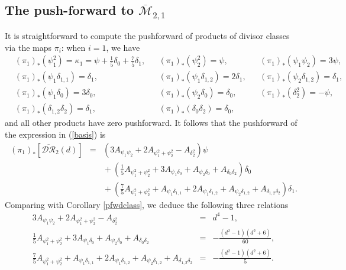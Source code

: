 \documentclass[10pt]{amsart}
\theoremstyle{definition}
\begin{document}
\subsection{The push-forward to ${\overline{\mathcal{M}}}_{2,1}$}
\label{push}
  It is straightforward to compute the pushforward of products of divisor classes via the maps $\pi_i$: when $i=1$, we have
\begin{align*}
 &(\pi_1)_*\left(\psi_1^2 \right) = \kappa_1 = \psi+\frac{1}{5}\delta_0 +\frac{7}{5}\delta_1, &&(\pi_1)_*\left(\psi_2^2 \right) = \psi, && (\pi_1)_*\left(\psi_1\psi_2 \right) = 3\psi,\\
&(\pi_1)_*\left(\psi_1\delta_{1,1} \right) = \delta_1, &&(\pi_1)_*\left(\psi_1\delta_{1,2} \right) = 2\delta_1, && (\pi_1)_*\left(\psi_2\delta_{1,2} \right) = \delta_1,\\
&(\pi_1)_*\left(\psi_1\delta_0 \right) = 3\delta_0, &&(\pi_1)_*\left(\psi_2\delta_0 \right) = \delta_0, && (\pi_1)_*\left(\delta_2^2 \right) = -\psi,\\
&(\pi_1)_*\left(\delta_{1,2}\delta_2 \right) = \delta_1, &&(\pi_1)_*\left(\delta_0\delta_2 \right) = \delta_0,
\end{align*}
and all other products have zero pushforward. It follows that the pushforward of the expression in (\ref{basis}) is
\begin{eqnarray*}
 (\pi_1)_*\left[ \overline{\mathcal{DR}}_2(d) \right] &=&  \left(3A_{\psi_1\psi_2}+2A_{\psi_1^2+\psi_2^2}-A_{\delta_2^2} \right)\psi \\
   && {}+ \left(\frac{1}{5}A_{\psi_1^2+\psi_2^2} +3A_{\psi_1\delta_0}+A_{\psi_2\delta_0}+A_{\delta_0\delta_2} \right) \delta_0 \\
   && {}+ \left(\frac{7}{5}A_{\psi_1^2+\psi_2^2}+A_{\psi_1\delta_{1,1}}+2A_{\psi_1\delta_{1,2}}+A_{\psi_2\delta_{1,2}}+A_{\delta_{1,2}\delta_2} \right) \delta_1.
\end{eqnarray*}
Comparing with Corollary \ref{pfwdclass}, we deduce the following three relations
\begin{eqnarray*}
 3A_{\psi_1\psi_2}+2A_{\psi_1^2+\psi_2^2}-A_{\delta_2^2} &=& d^4-1,\\
\frac{1}{5}A_{\psi_1^2+\psi_2^2} +3A_{\psi_1\delta_0}+A_{\psi_2\delta_0}+A_{\delta_0\delta_2} &=& -\frac{(d^2-1)(d^2+6)}{60},\\
\frac{7}{5}A_{\psi_1^2+\psi_2^2}+A_{\psi_1\delta_{1,1}}+2A_{\psi_1\delta_{1,2}}+A_{\psi_2\delta_{1,2}}+A_{\delta_{1,2}\delta_2} &=& -\frac{(d^2-1)(d^2+6)}{5}.
\end{eqnarray*}
\end{document}
